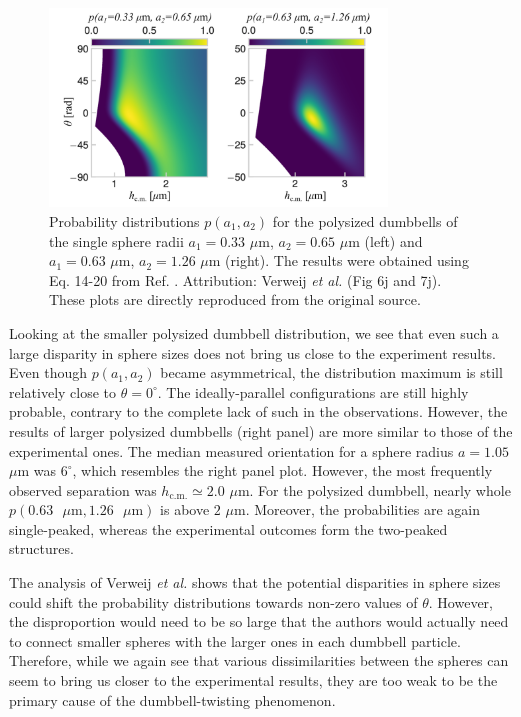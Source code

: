 \documentclass{master_thesis}
\begin{document}
\begin{figure}
    \centering
    \includegraphics[width=0.8\textwidth]{figures/polysized.png}
    \caption{Probability distributions $p(a_1,a_2)$ for the polysized dumbbells of the single sphere radii $a_1=0.33$ $\mu$m, $a_2=0.65$ $\mu$m (left) and $a_1=0.63$ $\mu$m, $a_2=1.26$ $\mu$m (right). The results were obtained using Eq. 14-20 from Ref. \cite{verweij2021}. Attribution: Verweij \textit{et al.} \cite{verweij2021} (Fig 6j and 7j). These plots are directly reproduced from the original source.}
\label{fig:polysized_distributions}
\end{figure}

Looking at the smaller polysized dumbbell distribution, we see that even such a large disparity in sphere sizes does not bring us close to the experiment results. Even though $p(a_1,a_2)$ became asymmetrical, the distribution maximum is still relatively close to $\theta=0^{\circ}$. The ideally-parallel configurations are still highly probable, contrary to the complete lack of such in the observations. However, the results of larger polysized dumbbells (right panel) are more similar to those of the experimental ones. The median measured orientation for a sphere radius $a=1.05$ $\mu$m was $6^{\circ}$, which resembles the right panel plot. However, the most frequently observed separation was $h_{\textrm{c.m.}}\simeq2.0$ $\mu$m. For the polysized dumbbell, nearly whole $p(0.63\textrm{ }\mu \textrm{m},1.26\textrm{ }\mu \textrm{m})$ is above $2$ $\mu$m. Moreover, the probabilities are again single-peaked, whereas the experimental outcomes form the two-peaked structures.

The analysis of Verweij \textit{et al.} \cite{verweij2021} shows that the potential disparities in sphere sizes could shift the probability distributions towards non-zero values of $\theta$. However, the disproportion would need to be so large that the authors would actually need to connect smaller spheres with the larger ones in each dumbbell particle. Therefore, while we again see that various dissimilarities between the spheres can seem to bring us closer to the experimental results, they are too weak to be the primary cause of the dumbbell-twisting phenomenon.
\end{document}
